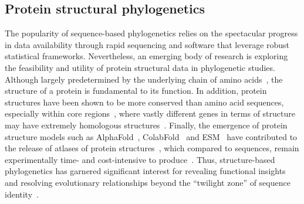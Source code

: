 \subsection{Protein structural phylogenetics}

The popularity of sequence-based phylogenetics relies on the spectacular progress in data availability through rapid sequencing and software that leverage robust statistical frameworks. Nevertheless, an emerging body of research is exploring the feasibility and utility of protein structural data in phylogenetic studies. Although largely predetermined by the underlying chain of amino acids~\cite{anfinsen1973}, the structure of a protein is fundamental to its function. In addition, protein structures have been shown to be more conserved than amino acid sequences, especially within core regions~\cite{wood1999, reeves2006, illergaard2009}, where vastly different genes in terms of structure may have extremely homologous structures~\cite{moi2022}. Finally, the emergence of protein structure models such as AlphaFold~\cite{jumper2021, abramson2024}, ColabFold~\cite{mirdita2022} and ESM~\cite{lin2023, hayes2025} have contributed to the release of atlases of protein structures~\cite{varadi2022, lin2023, kim2025b}, which compared to sequences, remain experimentally time- and cost-intensive to produce~\cite{schwede2013}. Thus, structure-based phylogenetics has garnered significant interest for revealing functional insights and resolving evolutionary relationships beyond the “twilight zone” of sequence identity~\cite{rost1999}.

